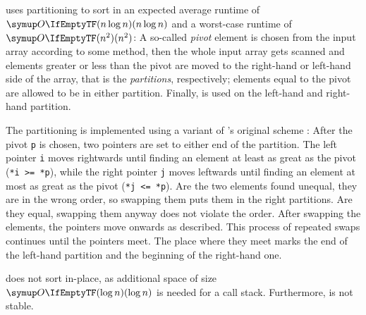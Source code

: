 \section{\texorpdfstring{\QS{}}{QuickSort}}
\label{sec:tasklet:quick}

\QS{} \cites{hoare1962quicksort}[88-91]{maurer1974datenstrukturen} uses partitioning to sort in an expected average runtime of \(\bigoh{n \log n}\) and a worst-case runtime of \(\bigoh{n^2}\):
A so-called \emph{pivot} element is chosen from the input array according to some method, then the whole input array gets scanned and elements greater or less than the pivot are moved to the right-hand or left-hand side of the array, that is the \emph{partitions}, respectively;
elements equal to the pivot are allowed to be in either partition.
Finally, \QS{} is used on the left-hand and right-hand partition.

The partitioning is implemented using a variant of \citeauthor{hoare1962quicksort}'s original scheme \cite{hoare1962quicksort}:
After the pivot \lstinline|p| is chosen, two pointers are set to either end of the partition.
The left pointer \lstinline|i| moves rightwards until finding an element at least as great as the pivot (\lstinline|*i >= *p|), while the right pointer \lstinline|j| moves leftwards until finding an element at most as great as the pivot (\lstinline|*j <= *p|).
Are the two elements found unequal, they are in the wrong order, so swapping them puts them in the right partitions.
Are they equal, swapping them anyway does not violate the order.
After swapping the elements, the pointers move onwards as described.
This process of repeated swaps continues until the pointers meet.
The place where they meet marks the end of the left-hand partition and the beginning of the right-hand one.

\QS{} does not sort in-place, as additional space of size \(\bigoh{\log n}\) is needed for a call stack.
Furthermore, \QS{} is not stable.


